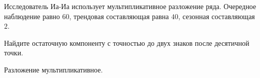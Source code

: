 
\begin{question}
Исследователь Иа-Иа использует мультипликативное разложение ряда.
Очередное наблюдение равно \(60\), трендовая составляющая равна \(40\),
сезонная составляющая \(2\).

Найдите остаточную компоненту с точностью до двух знаков после десятичной точки.
\end{question}

\begin{solution}
Разложение мультипликативное.
\end{solution}

